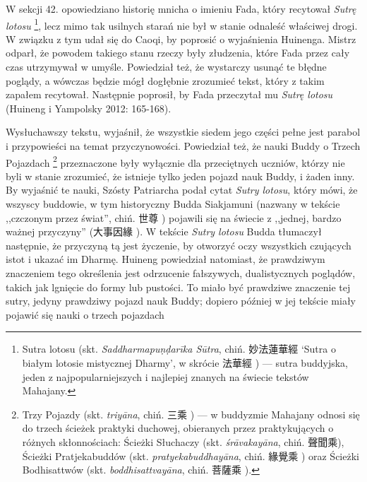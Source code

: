 W sekcji 42. opowiedziano historię mnicha o imieniu Fada, który recytował \textit{Sutrę lotosu}%
\footnote{Sutra lotosu (skt. \textit{Saddharmapu\d{n}\d{d}arīka Sūtra}, chiń. 妙法蓮華經  `Sutra o białym lotosie mistycznej Dharmy', w skrócie 法華經 ) --- sutra buddyjska, jeden z najpopularniejszych i najlepiej znanych na świecie tekstów Mahajany.},
lecz mimo tak usilnych starań nie był w stanie odnaleść właściwej drogi.
W związku z tym udał się do Caoqi, by poprosić o wyjaśnienia  Huinenga.
Mistrz odparł, że powodem takiego stanu rzeczy były złudzenia, które Fada przez cały czas utrzymywał w umyśle.
Powiedział też, że wystarczy usunąć te błędne poglądy, a wówczas będzie mógł dogłębnie zrozumieć tekst, który z takim zapałem recytował.
Następnie poprosił, by Fada przeczytał mu \textit{Sutrę lotosu}
(Huineng i Yampolsky 2012: 165-168).

Wysłuchawszy tekstu, wyjaśnił, że wszystkie siedem jego części pełne jest parabol i przypowieści na temat przyczynowości. %
Powiedział też, że nauki Buddy o Trzech Pojazdach%
\footnote{Trzy Pojazdy\label{Triyana} (skt. \textit{triyāna}, chiń. 三乘 ) --- w buddyzmie Mahajany odnosi się do trzech ścieżek praktyki duchowej, obieranych przez praktykujących o różnych skłonnościach: Ścieżki Słuchaczy (skt. \textit{śrāvakayāna}, chiń. 聲聞乘), Ścieżki Pratjekabuddów (skt. \textit{pratyekabuddhayāna}, chiń. 緣覺乘 ) oraz Ścieżki Bodhisattwów (skt. \textit{boddhisattvayāna}, chiń. 菩薩乘 ).}
przeznaczone były wyłącznie dla przeciętnych uczniów, którzy nie byli w stanie zrozumieć, że istnieje tylko jeden pojazd nauk Buddy, i żaden inny.
By wyjaśnić te nauki, Szósty Patriarcha podał cytat \textit{Sutry lotosu}, który mówi, że wszyscy buddowie, w tym historyczny Budda Siakjamuni (nazwany w tekście ,,czczonym przez świat'', chiń. 世尊 ) pojawili się na świecie z ,,jednej, bardzo ważnej przyczyny'' (大事因緣 ).
W tekście \textit{Sutry lotosu} Budda tłumaczył następnie, że przyczyną tą jest życzenie, by otworzyć oczy wszystkich czujących istot i ukazać im Dharmę.
Huineng powiedział natomiast, że prawdziwym znaczeniem tego określenia jest odrzucenie fałszywych, dualistycznych poglądów, takich jak lgnięcie do formy lub pustości.
To miało być prawdziwe znaczenie tej sutry, jedyny prawdziwy pojazd nauk Buddy; dopiero później w jej tekście miały pojawić się nauki o trzech pojazdach\ibid


